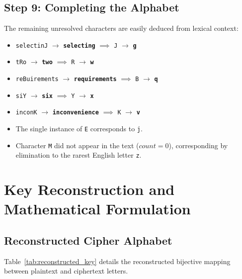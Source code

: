 \documentclass[12pt,a4paper]{article}
\begin{document}
\subsection{Step 9: Completing the Alphabet}
The remaining unresolved characters are easily deduced from lexical context:
\begin{itemize}
    \item \texttt{selectinJ} $\to$ \textbf{\texttt{selecting}} $\implies$ \texttt{J} $\to$ \textbf{\texttt{g}}
    \item \texttt{tRo} $\to$ \textbf{\texttt{two}} $\implies$ \texttt{R} $\to$ \textbf{\texttt{w}}
    \item \texttt{reBuirements} $\to$ \textbf{\texttt{requirements}} $\implies$ \texttt{B} $\to$ \textbf{\texttt{q}}
    \item \texttt{siY} $\to$ \textbf{\texttt{six}} $\implies$ \texttt{Y} $\to$ \textbf{\texttt{x}}
    \item \texttt{inconK} $\to$ \textbf{\texttt{inconvenience}} $\implies$ \texttt{K} $\to$ \textbf{\texttt{v}}
    \item The single instance of \texttt{E} corresponds to \texttt{j}.
    \item Character \texttt{M} did not appear in the text ($count = 0$), corresponding by elimination to the rarest English letter \texttt{z}.
\end{itemize}

\section{Key Reconstruction and Mathematical Formulation}

\subsection{Reconstructed Cipher Alphabet}
Table~\ref{tab:reconstructed_key} details the reconstructed bijective mapping between plaintext and ciphertext letters.
\end{document}

